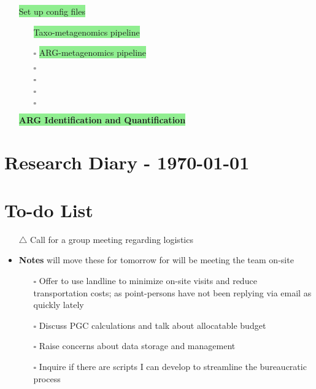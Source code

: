 \documentclass[11pt]{article}
\newcommand{\done}{\checkmark}  %
\newcommand{\pending}{$\square$}  %
\newcommand{\issue}{$\triangle$}  %
\newcommand{\highlightessential}[1]{\colorbox{lightgreen}{#1}}  %
\begin{document}
\begin{itemize}
	\item [\done] \highlightessential{Set up config files}
	\begin {itemize}
		\item [\done] \highlightessential{Taxo-metagenomics pipeline}
		\item [\pending] \highlightessential{ARG-metagenomics pipeline}
		\item [\pending] 
		\item [\pending] 
		\item [\pending]
		\item [\pending]

	\end{itemize}
\par\noindent\highlightessential{\textbf{\large ARG Identification and Quantification}}	
\end{itemize}


\onecolumn
\newpage
\setcounter{section}{0}  %
	
	\section*{Research Diary - \today}
	
	\section{To-do List}
	\begin{itemize}
		\item [\issue] Call for a group meeting regarding logistics
		\item \textbf{Notes} will move these for tomorrow for will be meeting the team on-site
		\begin{itemize}
			\item [\pending] Offer to use landline to minimize on-site visits and reduce transportation costs; as point-persons have not been replying via email as quickly lately
			\item [\pending] Discuss PGC calculations and talk about allocatable budget
			\item [\pending] Raise concerns about data storage and management
			\item [\pending] Inquire if there are scripts I can develop to streamline the bureaucratic process
		\end{itemize}
	\end{itemize}
	
\end{document}
